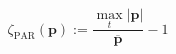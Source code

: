 \begin{equation}
	\zeta_\text{PAR}(\textbf{p}) := \frac{\max_t|\textbf{p}|}{\overline{\textbf{p}}} - 1
	\label{ch2:equ:cost-par}
\end{equation}